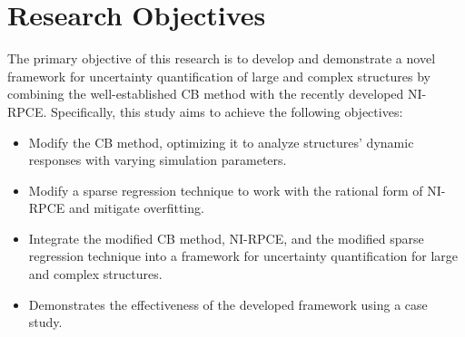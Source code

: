%
%

\section{Research Objectives}
\label{sec: objectives}

The primary objective of this research is to develop and demonstrate a novel framework for uncertainty quantification of large and complex structures by combining the well-established CB method with the recently developed NI-RPCE.
Specifically, this study aims to achieve the following objectives:

\begin{itemize}
    \item Modify the CB method, optimizing it to analyze structures' dynamic responses with varying simulation parameters.
    \item Modify a sparse regression technique to work with the rational form of NI-RPCE and mitigate overfitting.
    \item Integrate the modified CB method, NI-RPCE, and the modified sparse regression technique into a framework for uncertainty quantification for large and complex structures.
    \item Demonstrates the effectiveness of the developed framework using a case study.
\end{itemize}